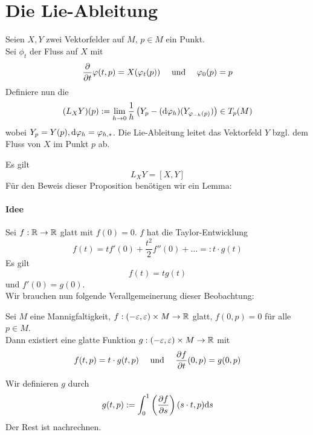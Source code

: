 \newpage
\section{Die Lie-Ableitung}
Seien $X,Y$ zwei Vektorfelder auf $M$, $p \in M$ ein Punkt.\\
Sei $\phi_t$ der Fluss auf $X$ mit
\begin{align*}
\frac{\partial }{\partial t} \varphi(t,p) = X(\varphi_t(p)) && \text{ und } && \varphi_0(p) = p
\end{align*}
Definiere nun die 
\begin{align*}
(L_XY)(p):=\lim\limits_{h\overset{}{\rightarrow} 0} \frac{1}{h} \left(
Y_p 
- (\text{d} \varphi_h)(Y_{\varphi_{-h}(p)})
\right)\in T_p(M)
\end{align*}
wobei $Y_p = Y(p), \text{d} \varphi_h = \varphi_{h,*}$. Die Lie-Ableitung leitet das Vektorfeld $Y$ bzgl. dem Fluss von $X$ im Punkt $p$ ab.

\Prop{}
\label{LieKlammerProp}
Es gilt
\[ L_XY = [X,Y] \]
Für den Beweis dieser Proposition benötigen wir ein Lemma:
\paragraph{Idee}
Sei $f: \mathbb{R} \overset{}{\rightarrow} \mathbb{R}$ glatt mit $f(0) = 0$. $f$ hat die Taylor-Entwicklung
\[ f(t) = t f'(0) + \frac{t^2}{2} f''(0) + \ldots =: t \cdot g(t) \]
Es gilt
\[ f(t) = tg(t) \]
und $f'(0) = g(0)$.\\
Wir brauchen nun folgende Verallgemeinerung dieser Beobachtung:

\Lem{}
Sei $M$ eine Mannigfaltigkeit, $f : (-\varepsilon, \varepsilon) \times M \overset{}{\rightarrow} \mathbb{R}$ glatt, $f(0,p) = 0$ für alle $p \in M$.\\
Dann existiert eine glatte Funktion $g: (-\varepsilon, \varepsilon) \times M \overset{}{\rightarrow} \mathbb{R}$ mit
\begin{align*}
f(t,p) = t\cdot g(t,p) && \text{ und } && \frac{\partial f}{\partial t}(0,p) = g(0,p)
\end{align*}
\begin{Beweis}{}
Wir definieren $g$ durch
\begin{align*}
g(t,p) := \int_{0}^{1} \left(\frac{\partial f}{\partial s}\right) (s\cdot t,p) \text{d} s
\end{align*}
Der Rest ist nachrechnen.
\end{Beweis}

